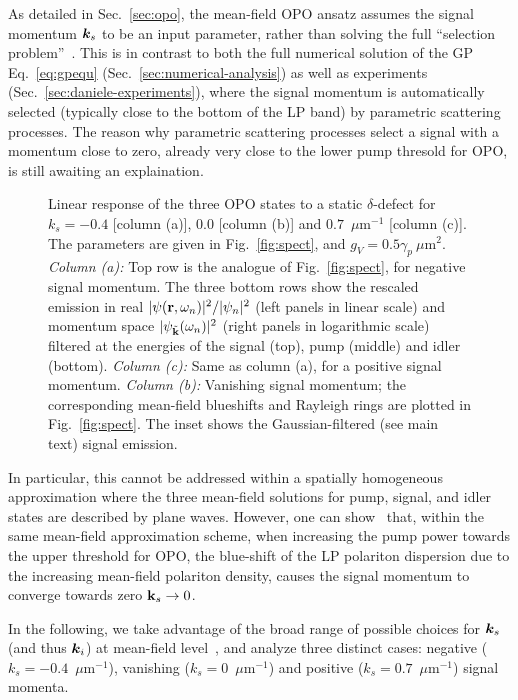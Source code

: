 As detailed in Sec.~\ref{sec:opo}, the mean-field OPO ansatz assumes
the signal momentum $\bm{k}_s$ to be an input parameter, rather than
solving the full ``selection problem''~\cite{Wouters_2007_b}. This is
in contrast to both the full numerical solution of the GP
Eq.~\eqref{eq:gpequ} (Sec.~\ref{sec:numerical-analysis}) as well as
experiments (Sec.~\ref{sec:daniele-experiments}), where the signal
momentum is automatically selected (typically close to the bottom of
the LP band) by parametric scattering processes. The reason why
parametric scattering processes select a signal with a momentum close
to zero, already very close to the lower pump thresold for OPO, is
still awaiting an explaination.
%

%
\begin{figure}[t]
  \caption{Linear response of the three OPO states to a static
  $\delta$-defect for $k_s = -0.4$ [column (a)], $0.0$ [column (b)] and
  $0.7$~$\mu$m$^{-1}$ [column (c)]. The parameters are given in
  Fig.~\ref{fig:spect}, and $g_V = 0.5 \gamma_p~\mu$m$^2$.  \emph{Column
    (a):} Top row is the analogue of Fig.~\ref{fig:spect}, for negative
  signal momentum. The three bottom rows show the rescaled emission in
  real $|\psi (\mathbf{r},\omega_n)|^2/|\psi_n|^2$ (left panels in linear
  scale) and momentum space $|\psi_{\tilde{\mathbf{k}}} (\omega_n)|^2$
  (right panels in logarithmic scale) filtered at the energies of the
  signal (top), pump (middle) and idler (bottom).  \emph{Column (c):} Same
  as column (a), for a positive signal momentum.  \emph{Column (b):}
  Vanishing signal momentum; the corresponding mean-field blueshifts and
  Rayleigh rings are plotted in Fig.~\ref{fig:spect}. The inset shows
  the Gaussian-filtered (see main text) signal emission.}%
\label{fig:ereal}
\end{figure}
%
In particular, this cannot be addressed within a spatially homogeneous
approximation where the three mean-field solutions for pump, signal,
and idler states are described by plane waves. However, one can
show~\cite{Whittaker_2005} that, within the same mean-field
approximation scheme, when increasing the pump power towards the upper
threshold for OPO, the blue-shift of the LP polariton dispersion due
to the increasing mean-field polariton density, causes the signal
momentum to converge towards zero $\mathbf{k}_s \rightarrow 0$.

In the following, we take advantage of the broad range of possible
choices for $\bm{k}_s$ (and thus $\bm{k}_i$) at mean-field
level~\cite{Wouters_2007_b}, and analyze three distinct cases:
negative ($k_s = -0.4$~$\mu$m$^{-1}$), vanishing
($k_s = 0$~$\mu$m$^{-1}$) and positive ($k_s = 0.7$~$\mu$m$^{-1}$)
signal momenta.

